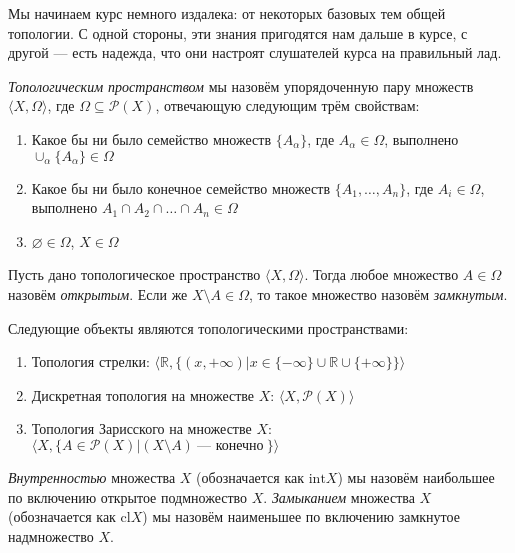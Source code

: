 Мы начинаем курс немного издалека: от некоторых базовых тем общей топологии.
С одной стороны, эти знания пригодятся нам дальше в курсе, с другой --- есть 
надежда, что они настроят слушателей курса на правильный лад.

\begin{definition} \emph{Топологическим пространством} мы назовём упорядоченную
пару множеств $\langle X, \Omega \rangle$, где $\Omega \subseteq {\mathcal{P}}(X)$,
отвечающую следующим трём свойствам:

\begin{enumerate}
\item Какое бы ни было семейство множеств $\{A_\alpha\}$, где $A_\alpha \in \Omega$, выполнено
$\cup_\alpha\{A_\alpha\} \in \Omega$
\item Какое бы ни было конечное семейство множеств $\{A_1, \dots, A_n\}$, где $A_i \in \Omega$,
выполнено $A_1 \cap A_2 \cap \dots \cap A_n \in \Omega$
\item $\varnothing \in \Omega$, $X \in \Omega$
\end{enumerate}
\end{definition}

\begin{definition} Пусть дано топологическое пространство $\langle X, \Omega \rangle$.
Тогда любое множество $A \in \Omega$ назовём \emph{открытым}. Если же $X \setminus A \in \Omega$, 
то такое множество назовём \emph{замкнутым}.
\end{definition}

\begin{theorem} Следующие объекты являются топологическими пространствами:
\begin{enumerate}
\item Топология стрелки: $\langle \mathbb{R}, \{(x,+\infty) | x \in \{-\infty\}\cup\mathbb{R}\cup\{+\infty\}\} \rangle$
\item Дискретная топология на множестве $X$: $\langle X, {\mathcal{P}}(X) \rangle$
\item Топология Зарисского на множестве $X$: $\langle X, \{ A \in {\mathcal{P}}(X) | (X \setminus A) ~\textrm{--- конечно}~\} \rangle$
\end{enumerate}
\end{theorem}

\begin{definition}
\emph{Внутренностью} множества $X$ (обозначается как $\mathrm{int} X$) мы назовём наибольшее по включению открытое подмножество $X$.
\emph{Замыканием} множества $X$ (обозначается как $\mathrm{cl} X$) мы назовём наименьшее по включению замкнутое надмножество $X$.
\end{definition}

